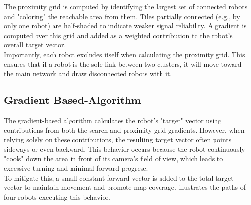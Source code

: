 The proximity grid is computed by identifying the largest set of connected robots and "coloring" the reachable area from them. Tiles partially connected (e.g., by only one robot) are half-shaded to indicate weaker signal reliability. A gradient is computed over this grid and added as a weighted contribution to the robot’s overall target vector. \\

Importantly, each robot excludes itself when calculating the proximity grid. This ensures that if a robot is the sole link between two clusters, it will move toward the main network and draw disconnected robots with it. \\

\subsection{Gradient Based-Algorithm}
The gradient-based algorithm calculates the robot's "target" vector using contributions from both the search and proximity grid gradients. However, when relying solely on these contributions, the resulting target vector often points sideways or even backward. This behavior occurs because the robot continuously "cools" down the area in front of its camera's field of view, which leads to excessive turning and minimal forward progrese. \\

To mitigate this, a small constant forward vector is added to the total target vector to maintain movement and promote map coverage.  illustrates the paths of four robots executing this behavior.

